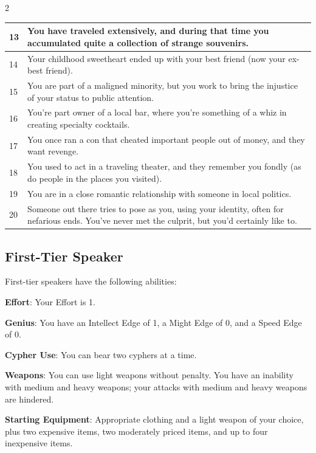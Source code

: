 \begin{multicols}{2}
\begin{table}
\begin{tabularx}{\textwidth}{| p{} | p{} |}
13 & You have traveled extensively, and during that time you accumulated quite a collection of strange souvenirs. \\ \hline
14 & Your childhood sweetheart ended up with your best friend (now your ex-best friend). \\ \hline
15 & You are part of a maligned minority, but you work to bring the injustice of your status to public attention. \\ \hline
16 & You’re part owner of a local bar, where you’re something of a whiz in creating specialty cocktails. \\ \hline
17 & You once ran a con that cheated important people out of money, and they want revenge.  \\ \hline
18 & You used to act in a traveling theater, and they remember you fondly (as do people in the places you visited). \\ \hline
19 & You are in a close romantic relationship with someone in local politics. \\ \hline
20 & Someone out there tries to pose as you, using your identity, often for nefarious ends. You’ve never met the culprit, but you’d certainly like to. \\ \hline

\end{tabularx}

\end{table}

\subsection{First-Tier Speaker}

First-tier speakers have the following abilities:

\textbf{Effort}: Your Effort is 1.

\textbf{Genius}: You have an Intellect Edge of 1, a Might Edge of 0, and a Speed Edge of 0.

\textbf{Cypher Use}: You can bear two cyphers at a time.

\textbf{Weapons}: You can use light weapons without penalty. You have an inability with medium and heavy weapons; your attacks with medium and heavy weapons are hindered.

\textbf{Starting Equipment}: Appropriate clothing and a light weapon of your choice, plus two expensive items, two moderately priced items, and up to four inexpensive items.


\end{multicols}
